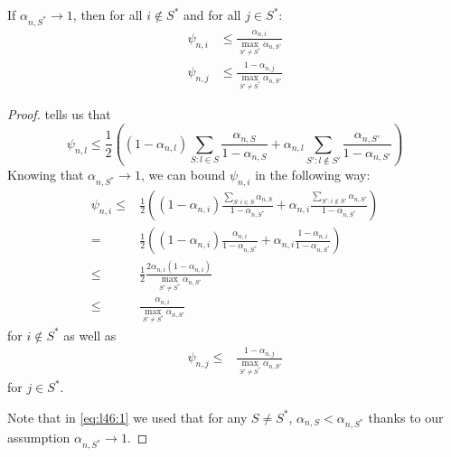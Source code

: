 \textbf{}
If $\alpha_{n, S^*} \rightarrow 1$, then for all $i \notin S^*$ and for all
$j \in S^*$:
\begin{align}
  \psi_{n, i} &\leq \frac{\alpha_{n, i}}{\max_{S' \neq S^*} \alpha_{n, S'}} \\
  \psi_{n, j} &\leq \frac{1 - \alpha_{n, j}}{\max_{S' \neq S^*} \alpha_{n,
      S'}}
\end{align}
\begin{proof}
   tells us that
  \[\psi_{n, l} \leq \frac{1}{2}((1 - \alpha_{n, l}) \sum_{S: l \in S}
      \frac{\alpha_{n, S}}{1 - \alpha_{n, S}} + \alpha_{n, l}
      \sum_{S': l \notin S'} \frac{\alpha_{n, S'}}{1 - \alpha_{n, S'}})\]
  Knowing that $\alpha_{n, S^*} \rightarrow 1$, we can bound $\psi_{n, i}$ in
  the following way:
  \begin{align}
    \psi_{n, i} \leq& \frac{1}{2}((1 - \alpha_{n, i}) \frac{\sum_{S: i \in S}
        \alpha_{n, S}}{1 - \alpha_{n, S^*}} + \alpha_{n, i} \frac{\sum_{S': i
        \notin S'} \alpha_{n, S'}}{1 - \alpha_{n, S^*}}) \label{eq:l46:1}\\
      =& \frac{1}{2}((1 - \alpha_{n, i}) \frac{\alpha_{n, i}}{1 - \alpha_{n,
          S^*}} + \alpha_{n, i} \frac{1 - \alpha_{n, i}}{1 - \alpha_{n, S^*}})\\
      \leq& \frac{1}{2} \frac{2 \alpha_{n, i} (1 - \alpha_{n, i})}{\max_{S'
          \neq S^*} \alpha_{n, S'}} \\
      \leq& \frac{\alpha_{n, i}}{\max_{S' \neq S^*} \alpha_{n, S'}}
  \end{align}
  for $i \notin S^*$ as well as
  \begin{align}
    \psi_{n, j} \leq& \frac{1 - \alpha_{n, j}}{\max_{S' \neq S^*} \alpha_{n,
        S'}}
  \end{align}
  for $j \in S^*$.

  Note that in \eqref{eq:l46:1} we used that for any $S \neq S^*$, $\alpha_{n,
  S} < \alpha_{n, S^*}$ thanks to our assumption $\alpha_{n, S^*} \rightarrow
  1$.
\end{proof}

